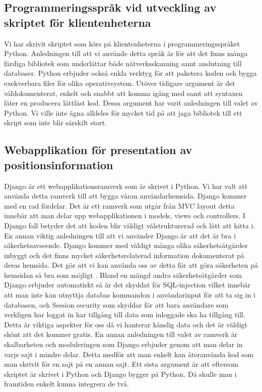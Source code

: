 \documentclass[swedish, a4paper,12pt]{article}
\begin{document}
\subsection{Programmeringsspråk vid utveckling av skriptet för klientenheterna} %
Vi har skrivit skriptet som körs på klientenheterna i programmeringsspråket Python.
Anledningen till att vi använde detta språk är för att det finns många färdiga bibliotek som underlättar både nätverksskanning samt anslutning till databaser. Python erbjuder också enkla verktyg för att paketera koden och bygga exekverbara filer för olika operativsystem. Utöver tidigare argument är det väldokumenterat, enkelt och snabbt att komma igång med samt att syntaxen låter en producera lättläst kod. Dessa argument har varit anledningen till valet av Python. Vi ville inte ägna alldeles för mycket tid på att jaga bibliotek till ett skript som inte blir särskilt stort.

\subsection{Webapplikation för presentation av positionsinformation}
Django är ett webapplikationsramverk som är skrivet i Python. Vi har valt att använda detta ramverk till att bygga våran användarhemsida. Django kommer med en rad fördelar. Det är ett ramverk som utgår från MVC layout %
detta innebär att man delar upp webapplikationen i models, views och controllers. I Django fall betyder det att koden blir väldigt välstrukturerad och lätt att hitta i.
En annan viktig anledningen till att vi använder Django är att det är bra i säkerhetsavseende. Django kommer med väldigt många olika säkerhetsåtgärder inbyggt och det finns mycket säkerhetsrelaterad information dokumenterat på deras hemsida. Det gör att vi kan använda oss av detta för att göra säkerheten på hemsidan så bra som möjligt \cite{securityInDjango}. Bland en mängd andra säkerhetsåtgärder som Django erbjuder automatiskt så är det skyddat för SQL-injection %
vilket innebär att man inte kan utnyttja databas kommandon i användarinput för att ta sig in i databasen, och Session security %
som skyddar för att bara användare som verkligen har loggat in har tillgång till data som inloggade ska ha tillgång till.
Detta är viktiga aspekter för oss då vi hanterar känslig data och det är väldigt skönt att det kommer gratis. En annan anledningen till valet av ramverk är skalbarheten och moduleringen som Django erbjuder genom att man delar in varje sajt i mindre delar. Detta medför att man enkelt kan återanvända kod som man skrivit för en sajt på en annan sajt.
Ett sista argument är att eftersom skriptet är skrivet i Python och Django bygger på Python. Då skulle man i framtiden enkelt kunna integrera de två.
\end{document}
